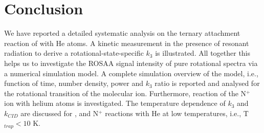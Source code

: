 \section{Conclusion}
\label{sec:CD+_conclusion}

We have reported a detailed systematic analysis on the ternary attachment reaction of \CD with He atoms. A kinetic measurement in the presence of resonant radiation to derive a rotational-state-specific $k_3$ is illustrated. All together this helps us to investigate the ROSAA signal intensity of pure rotational spectra via a numerical simulation model. 
A complete simulation overview of the model, i.e., function of time, number density, power and $k_3$ ratio is reported and analysed for the \CDline rotational transition of the \CD molecular ion. Furthermore, reaction of the N$^+$ ion with helium atoms is investigated. The temperature dependence of $k_3$ and $k_{CID}$ are discussed for \CD, and N$^+$ reactions with He at low temperatures, i.e., T$_{trap}<10$ K.

